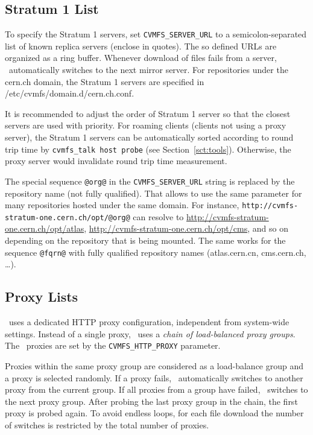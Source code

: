 \subsection{Stratum 1 List}
To specify the Stratum 1 servers, set \texttt{CVMFS\_SERVER\_URL} to a semicolon-separated list of known replica servers (enclose in quotes). 
The so defined URLs are organized as a ring buffer.
Whenever download of files fails from a server, \cvmfs\ automatically switches to the next mirror server.
For repositories under the cern.ch domain, the Stratum 1 servers are specified in /etc/cvmfs/domain.d/cern.ch.conf.

It is recommended to adjust the order of Stratum 1 server so that the closest servers are used with priority.
For roaming clients (\ie clients not using a proxy server), the Stratum 1 servers can be automatically sorted according to round trip time by \texttt{cvmfs\_talk host probe} (see Section~\ref{sct:tools}).
Otherwise, the proxy server would invalidate round trip time measurement.

The special sequence \texttt{@org@} in the \texttt{CVMFS\_SERVER\_URL} string is replaced by the repository name (not fully qualified).
That allows to use the same parameter for many repositories hosted under the same domain.
For instance, \texttt{http://cvmfs-stratum-one.cern.ch/opt/@org@} can resolve to \url{http://cvmfs-stratum-one.cern.ch/opt/atlas}, \url{http://cvmfs-stratum-one.cern.ch/opt/cms}, and so on depending on the repository that is being mounted.
The same works for the sequence \texttt{@fqrn@} with fully qualified repository names (\eg atlas.cern.cn, cms.cern.ch, \dots).

\subsection{Proxy Lists}
\cvmfs\ uses a dedicated HTTP proxy configuration, independent from system-wide settings. 
Instead of a single proxy, \cvmfs\ uses a \emph{chain of load-balanced proxy groups}.
The \cvmfs\ proxies are set by the \texttt{CVMFS\_HTTP\_PROXY} parameter.

Proxies within the same proxy group are considered as a load-balance group and a proxy is selected randomly.
If a proxy fails, \cvmfs\ automatically switches to another proxy from the current group.
If all proxies from a group have failed, \cvmfs\ switches to the next proxy group.
After probing the last proxy group in the chain, the first proxy is probed again.
To avoid endless loops, for each file download the number of switches is restricted by the total number of proxies.

